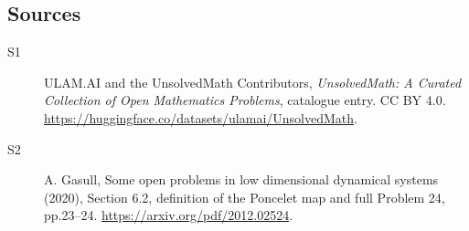 \documentclass[11pt]{article}
\begin{document}
\subsection{Sources}
\begin{description}
\item[\hypertarget{source:statement:1}{S1}] ULAM.AI and the UnsolvedMath Contributors, \emph{UnsolvedMath: A Curated Collection of Open Mathematics Problems}, catalogue entry. CC BY 4.0. \url{https://huggingface.co/datasets/ulamai/UnsolvedMath}.
\item[\hypertarget{source:statement:2}{S2}] A. Gasull, Some open problems in low dimensional dynamical systems (2020), Section 6.2, definition of the Poncelet map and full Problem 24, pp.23--24. \url{https://arxiv.org/pdf/2012.02524}.
\end{description}
\label{end:statement}
\end{document}

